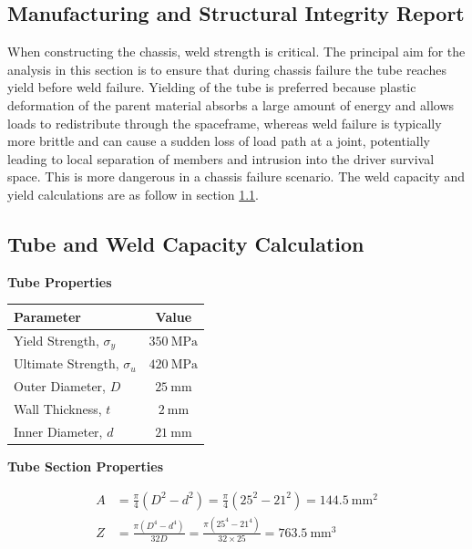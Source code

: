\documentclass[11pt, a4paper]{report}
\numberwithin{equation}{section}
\begin{document}
\begin{refsection}
\section{Manufacturing and Structural Integrity Report}

When constructing the chassis, weld strength is critical. The principal aim for the analysis in this section is to ensure that during chassis failure the tube reaches yield before weld failure. Yielding of the tube is preferred because plastic deformation of the parent material absorbs a large amount of energy and allows loads to redistribute through the spaceframe, whereas weld failure is typically more brittle and can cause a sudden loss of load path at a joint, potentially leading to local separation of members and intrusion into the driver survival space. This is more dangerous in a chassis failure scenario. The weld capacity and yield calculations are as follow in section \ref{sec:tube_weld_capacity}.
\subsection{Tube and Weld Capacity Calculation}
\label{sec:tube_weld_capacity}
\noindent\textbf{Tube Properties}\par
\vspace{4pt}
\begin{table}[h]
    \centering
    \begin{tabular}{|l|c|}
        \hline
        Parameter & Value \\
        \hline
        Yield Strength, $\sigma_y$ & $350\ \text{MPa}$ \\
        Ultimate Strength, $\sigma_u$ & $420\ \text{MPa}$ \\
        Outer Diameter, $D$ & $25\ \text{mm}$ \\
        Wall Thickness, $t$ & $2\ \text{mm}$ \\
        Inner Diameter, $d$ & $21\ \text{mm}$ \\
        \hline
    \end{tabular}
\end{table}
\vspace{6pt}

\noindent\textbf{Tube Section Properties}\par
\vspace{4pt}
\begin{align*}
A &= \frac{\pi}{4}(D^2 - d^2)
= \frac{\pi}{4}(25^2 - 21^2)
= 144.5\ \text{mm}^2 \\
Z &= \frac{\pi (D^4 - d^4)}{32D}
= \frac{\pi (25^4 - 21^4)}{32 \times 25}
= 763.5\ \text{mm}^3
\end{align*}


\end{refsection}
\end{document}
